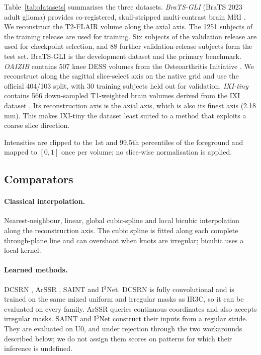 \documentclass[a4paper,fleqn]{cas-dc}
\newcommand{\Ithree}{I$^3$Net\xspace}
\begin{document}
Table~\ref{tab:datasets} summarises the three datasets. \emph{BraTS-GLI} (BraTS 2023 adult
glioma) provides co-registered, skull-stripped multi-contrast brain MRI
\citep{menze2015brats,bakas2017brats,baid2021brats}. We reconstruct the T2-FLAIR volume along
the axial axis. The 1251 subjects of the training release are used for training. Six
subjects of the validation release are used for checkpoint selection, and 88 further
validation-release subjects form the test set. BraTS-GLI is the development dataset and the
primary benchmark. \emph{OAIZIB} contains 507 knee DESS volumes from the Osteoarthritis
Initiative \citep{peterfy2008oai,ambellan2019oaizib}. We reconstruct along the sagittal
slice-select axis on the native grid and use the official 404/103 split, with 30 training
subjects held out for validation. \emph{IXI-tiny} contains 566 down-sampled T1-weighted brain
volumes derived from the IXI dataset \citep{ixi}. Its reconstruction axis is the axial axis,
which is also its finest axis (2.18\,mm). This makes IXI-tiny the dataset least suited to a
method that exploits a coarse slice direction.

Intensities are clipped to the 1st and 99.5th percentiles of the foreground and mapped to
$[0,1]$ once per volume; no slice-wise normalisation is applied.



\subsection{Comparators}
\label{sec:baselines}

\paragraph{Classical interpolation.} Nearest-neighbour, linear, global cubic-spline and local
bicubic interpolation along the reconstruction axis. The cubic spline is fitted along each
complete through-plane line and can overshoot when knots are irregular; bicubic uses a local
kernel.

\paragraph{Learned methods.} DCSRN \citep{chen2018dcsrn}, ArSSR \citep{wu2023arssr}, SAINT
\citep{peng2020saint} and \Ithree \citep{song2024i3net}. DCSRN is fully convolutional and is
trained on the same mixed uniform and irregular masks as IR3C, so it can be evaluated on
every family. ArSSR queries continuous coordinates and also accepts irregular masks. SAINT and
\Ithree construct their inputs from a regular stride. They are evaluated on U0, and under
rejection through the two workarounds described below; we do not assign them scores on
patterns for which their inference is undefined.
\end{document}
